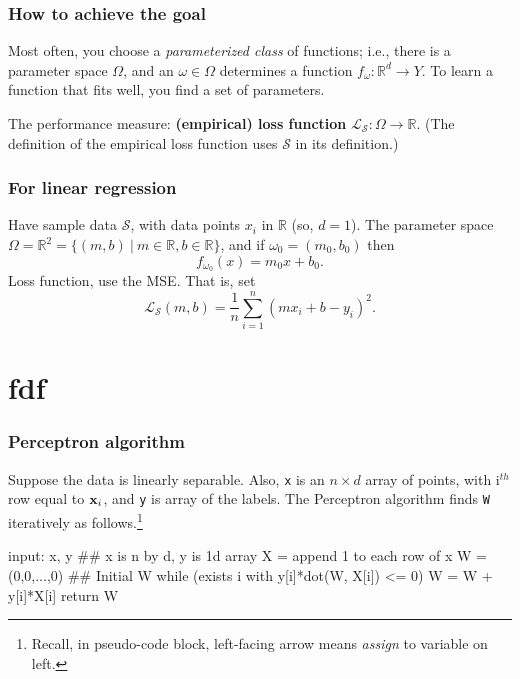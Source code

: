 \documentclass{beamer}
\theoremstyle{example}
\newcommand{\ttt}[1]{{\small\texttt{#1}}}
\begin{document}
\begin{frame}
\frametitle{How to achieve the goal}
Most often, you choose a \textit{parameterized class} of functions; i.e., there is a parameter space $\Omega$, and an $\omega\in\Omega$ determines a function $f_{\omega}:\mathbb R^d \to Y$. To learn a function that fits well, you find a set of parameters.

The performance measure: \textbf{(empirical) loss function} $\mathcal L_{\mathcal S}:\Omega \to \mathbb R$. (The definition of the empirical loss function uses $\mathcal S$ in its definition.)

\end{frame}

\begin{frame}
    \frametitle{For linear regression}
    Have sample data $\mathcal S$, with data points $x_i$ in $\mathbb R$ (so, $d=1$). The parameter space $\Omega = \mathbb R^2 = \{(m,b)\ |\ m\in\mathbb R, b\in\mathbb R\}$, and if $\omega_0 = (m_0,b_0)$ then
        \[f_{\omega_0}(x) = m_0x + b_0.\]
    Loss function, use the MSE. That is, set 
        \[\mathcal L_{\mathcal S}(m,b) = \frac1{n}\sum_{i=1}^n (mx_i + b - y_i)^2.\]
\end{frame}

\section{fdf}

\begin{frame}[fragile]
\frametitle{Perceptron algorithm}
Suppose the data is linearly separable. Also, \ttt{x} is an $n\times d$ array of points, with i$^{th}$ row equal to ${\bf x}_i$, and \ttt{y} is array of the labels. The Perceptron algorithm finds \ttt{W} iteratively as follows.\footnote{Recall, in pseudo-code block, left-facing arrow means \textit{assign} to variable on left.}
\pause 

\begin{pseudo}
input: x, y  ## x is n by d, y is 1d array
X = append 1 to each row of x
W = (0,0,...,0)  ## Initial W
while (exists i with y[i]*dot(W, X[i]) <= 0){
    W = W + y[i]*X[i]
}
return W
\end{pseudo}

\end{frame}
\end{document}
